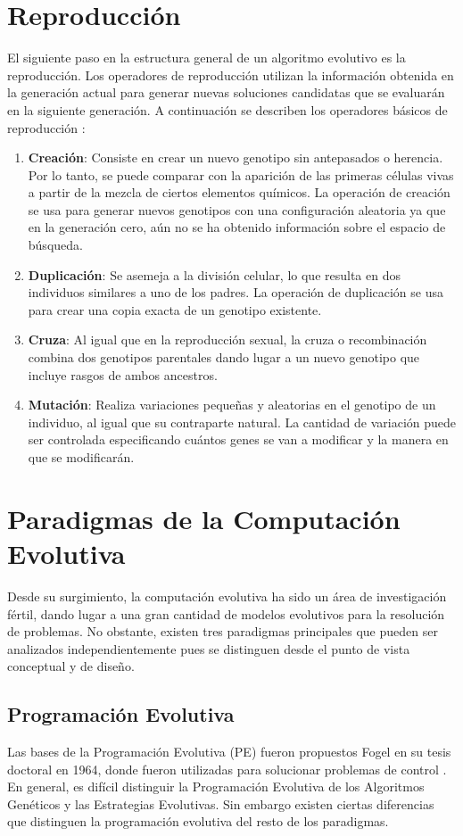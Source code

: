 \section{Reproducción}\label{Reproduccion} 
El siguiente paso en la estructura general de un algoritmo evolutivo es la reproducción. Los operadores de reproducción utilizan la información obtenida en la generación actual para generar nuevas soluciones candidatas que se evaluarán en la siguiente generación. A continuación se describen los operadores básicos de reproducción \cite{weise2009global}:
\begin{enumerate}
\item \textbf{Creación}: Consiste en crear un nuevo genotipo sin antepasados o herencia. Por lo tanto, se puede comparar con la aparición de las primeras células vivas a partir de la mezcla de ciertos elementos químicos. La operación de creación se usa para generar nuevos genotipos con una configuración aleatoria ya que en la generación cero, aún no se ha obtenido información sobre el espacio de búsqueda. 
\item \textbf{Duplicación}: Se asemeja a la división celular, lo que resulta en dos individuos similares a uno de los padres.  La operación de duplicación se usa para crear una copia exacta de un genotipo existente.
\item \textbf{Cruza}: Al igual que en la reproducción sexual, la cruza o recombinación combina dos genotipos parentales dando lugar a un nuevo genotipo que incluye rasgos de ambos ancestros. 

\item \textbf{Mutación}: Realiza variaciones pequeñas y aleatorias en el genotipo de un individuo, al igual que su contraparte natural. La cantidad de variación puede ser controlada especificando cuántos genes se van a modificar y la manera en que se modificarán.
\end{enumerate}



\section{Paradigmas de la Computación Evolutiva}
Desde su surgimiento, la computación evolutiva ha sido un área de investigación fértil, dando lugar a una gran cantidad de modelos evolutivos para la resolución de problemas. No obstante, existen tres paradigmas principales que pueden ser analizados independientemente pues se distinguen desde el punto de vista conceptual y de diseño. 
\subsection{Programación Evolutiva}
Las bases de la Programación Evolutiva (PE) fueron propuestos  Fogel  en su tesis doctoral en 1964, donde fueron utilizadas para solucionar problemas de control \cite{fogel1993applying}. En general, es difícil distinguir la Programación Evolutiva de los Algoritmos Genéticos y las Estrategias Evolutivas. Sin embargo existen ciertas diferencias que distinguen la programación evolutiva del resto de los paradigmas.

